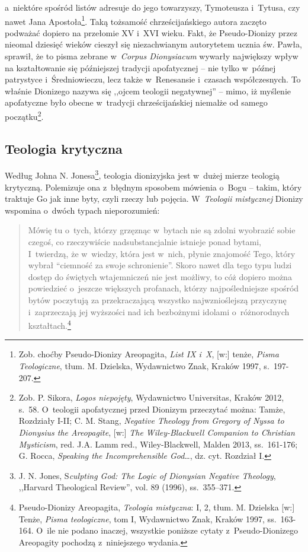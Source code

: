 a~niektóre spośród listów adresuje do jego towarzyszy, Tymoteusza i~Tytusa, czy nawet Jana Apostoła\footnote{Zob. choćby Pseudo-Dionizy Areopagita, \textit{List IX i~X}, [w:] tenże, \textit{Pisma Teologiczne}, tłum. M. Dzielska, Wydawnictwo Znak, Kraków 1997, s.~197-207.}. Taką tożsamość chrześcijańskiego autora zaczęto podważać dopiero na przełomie XV i~XVI wieku. Fakt, że Pseudo-Dionizy przez nieomal dziesięć wieków cieszył się niezachwianym autorytetem ucznia św. Pawła, sprawił, że to pisma zebrane w~\textit{Corpus Dionysiacum} wywarły największy wpływ na kształtowanie się późniejszej tradycji apofatycznej -- nie tylko w~późnej patrystyce i~Średniowieczu, lecz także w~Renesansie i~czasach współczesnych. To właśnie Dionizego nazywa się ,,ojcem teologii negatywnej'' -- mimo, iż myślenie apofatyczne było obecne w~tradycji chrześcijańskiej niemalże od samego początku\footnote{Zob. P. Sikora, \textit{Logos niepojęty}, Wydawnictwo Universitas, Kraków 2012, s.~58. O~teologii apofatycznej przed Dionizym przeczytać można: Tamże, Rozdziały I-II; C. M. Stang, \textit{Negative Theology from Gregory of Nyssa to Dionysius the Areopagite}, [w:] \textit{The Wiley-Blackwell Companion to Christian Mysticism}, red. J.A. Lamm red., Wiley-Blackwell, Malden 2013, ss.~161-176; G. Rocca, \textit{Speaking the Incomprehensible God}\ldots, dz. cyt. Rozdział I.}.


\subsection*{Teologia krytyczna}

Według Johna N. Jonesa\footnote{J. N. Jones, S\textit{culpting God: The Logic of Dionysian Negative Theology}, ,,Harvard Theological Review'', vol. 89 (1996), ss.~355–371.}, teologia dionizyjska jest w~dużej mierze teologią krytyczną. Polemizuje ona z~błędnym sposobem mówienia o~Bogu -- takim, który traktuje Go jak inne byty, czyli rzeczy lub pojęcia. W~\textit{Teologii mistycznej} Dionizy wspomina o~dwóch typach nieporozumień:

\begin{quote}
Mówię tu o~tych, którzy grzęznąc w~bytach nie są zdolni wyobrazić sobie czegoś, co rzeczywiście nadsubstancjalnie istnieje ponad bytami, I~twierdzą, że w~wiedzy, która jest w~nich, płynie znajomość Tego, który wybrał ``ciemność za swoje schronienie''. Skoro nawet dla tego typu ludzi dostęp do świętych wtajemniczeń nie jest możliwy, to cóż dopiero można powiedzieć o~jeszcze większych profanach, którzy najpośledniejsze spośród bytów poczytują za przekraczającą wszystko najwznioślejszą przyczynę i~zaprzeczają jej wyższości nad ich bezbożnymi idolami o~różnorodnych kształtach.\footnote{Pseudo-Dionizy Areopagita, \textit{Teologia mistyczna}: I, 2, tłum. M. Dzielska [w:] Tenże, \textit{Pisma teologiczne}, tom I, Wydawnictwo Znak, Kraków 1997, ss.~163-164. O~ile nie podano inaczej, wszystkie poniższe cytaty z~Pseudo-Dionizego Areopagity pochodzą z~niniejszego wydania.}
\end{quote}

